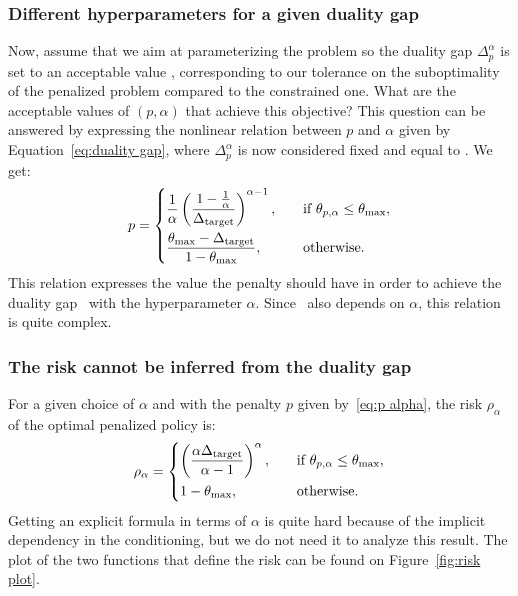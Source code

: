 \subsubsection{Different hyperparameters for a given duality gap}
Now, assume that we aim at parameterizing the problem so the duality gap $\Delta_p^\alpha$ is set to an acceptable value \Deltatarget, corresponding to our tolerance on the suboptimality of the penalized problem compared to the constrained one. What are the acceptable values of $(p, \alpha)$ that achieve this objective? This question can be answered by expressing the nonlinear relation between $p$ and $\alpha$ given by Equation~\ref{eq:duality gap}, where $\Delta_p^\alpha$ is now considered fixed and equal to \Deltatarget. We get:
\begin{equation}
	p = \begin{dcases}
		\frac{1}{\alpha}\left(\frac{1 - \frac{1}{\alpha}}{\Delta_\text{target}}\right)^{\alpha - 1},&\quad\text{if}~\theta_{p, \alpha}\leq\theta_\text{max},\\
		\frac{\theta_\text{max} - \Delta_\text{target}}{1 - \theta_\text{max}},&\quad\text{otherwise}.
	\end{dcases}\label{eq:p alpha}
\end{equation}
This relation expresses the value the penalty should have in order to achieve the duality gap \Deltatarget~with the hyperparameter $\alpha$. Since \thetamax~also depends on $\alpha$, this relation is quite complex.

\subsubsection{The risk cannot be inferred from the duality gap}
For a given choice of $\alpha$ and with the penalty $p$ given by~\eqref{eq:p alpha}, the risk $\rho_{\alpha}$ of the optimal penalized policy is:
\begin{equation}
	\rho_{\alpha} = \begin{dcases}
		\left(\frac{\alpha\Delta_\text{target}}{\alpha - 1}\right)^\alpha,& \quad\text{if}~\theta_{p, \alpha}\leq\theta_\text{max},\\
		1 - \theta_\text{max},&\quad\text{otherwise}.
	\end{dcases} \label{eq:risk alpha}
\end{equation}
Getting an explicit formula in terms of $\alpha$ is quite hard because of the implicit dependency in the conditioning, but we do not need it to analyze this result. The plot of the two functions that define the risk can be found on Figure~\ref{fig:risk plot}. 
